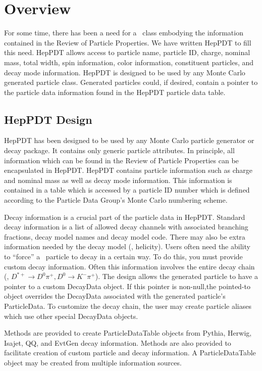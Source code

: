 
\section{Overview}

For some time, there has been a need for a \cpp\ class embodying the
information contained in the Review of Particle Properties\cite{pdg}.
We have written HepPDT to fill this need.  
HepPDT allows access
to particle name, particle ID, charge, nominal mass,  total width,
spin information, color information, constituent particles, and
decay mode information.
HepPDT is designed to be used by any Monte Carlo generated particle class. 
Generated particles could, if desired, contain a
pointer to the particle data information found in the HepPDT
particle data table.  

\subsection{HepPDT Design}

HepPDT has been designed to be used by any Monte Carlo particle generator
or decay package.  It contains only generic particle attributes.
In principle, all information which can be found in
the Review of Particle Properties\cite{pdg} can be encapsulated in HepPDT.
HepPDT contains particle information such as charge and nominal mass
as well as decay mode information.  This information is contained
in a table which is accessed by a particle ID number which
is defined according to the Particle Data Group's
Monte Carlo numbering scheme\cite{scheme}.  

Decay information is a crucial part of the particle data in HepPDT.
Standard decay information is a list of allowed decay channels with
associated branching fractions, decay model names and decay model code.  
There may also be
extra information needed by the decay model (\eg, helicity).
Users often need the ability to ``force'' a \
particle to decay in a certain way.
To do this, you must provide custom decay information.  Often this information
involves the entire decay chain (\eg, $D^{*+} \rightarrow D^0 \pi^+, 
D^0 \rightarrow K^- \pi^+$).  The design allows the generated
particle to have a pointer to a custom DecayData object.  
If this pointer is non-null,the pointed-to
object overrides the DecayData associated with the generated
particle's ParticleData. 
To customize the decay chain, the user may create
particle aliases which use other special DecayData objects.

Methods are provided to create ParticleDataTable objects from
Pythia, Herwig, Isajet, QQ, and EvtGen decay information.  Methods
are also provided to facilitate creation of custom particle and
decay information.  A ParticleDataTable object may be created from
multiple information sources.

